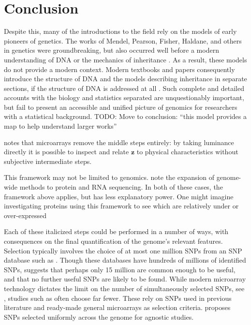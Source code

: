 \documentclass{article}
\newcommand{\ve}[1]{\mathbf{#1}}           %
\newcommand{\TODO}[1]{{\color{brickred} TODO:  {#1}}}
\begin{document}

\section{Conclusion} \label{sec:conclusion}

Despite this, many of the introductions to the field rely on the models of early pioneers of genetics. The works of Mendel, Pearson, Fisher, Haldane, and others in genetics were groundbreaking, but also occurred well before a modern understanding of DNA or the mechanics of inheritance \cite{visschergoddard2019}. As a result, these models do not provide a modern context. Modern textbooks and papers consequently introduce the structure of DNA and the models describing inheritance in separate sections, if the structure of DNA is addressed at all \cite{crowkimura1970intro, siegmundyakir2007, xu2013principles, liu1998statistical}. Such complete and detailed accounts with the biology and statistics separated are unquestionably important, but fail to present an accessible and unified picture of genomics for researchers with a statistical background. \TODO{Move to conclusion: ``this model provides a map to help understand larger works''}

\cite{laframboise2009} notes that microarrays remove the middle steps entirely: by taking luminance directly it is possible to inspect and relate $\ve{z}$ to physical characteristics without subjective intermediate steps.

This framework may not be limited to genomics. \cite{hasinetal2017multi} note the expansion of genome-wide methods to protein and RNA sequencing. In both of these cases, the framework above applies, but has less explanatory power. One might imagine investigating proteins using this framework to see which are relatively under or over-expressed

Each of these italicized steps could be performed in a number of ways, with consequences on the final quantification of the genome's relevant features. Selection typically involves the choice of at most one million SNPs from an SNP database such as \cite{NCBIdbSNP}. Though these databases have hundreds of millions of identified SNPs, \cite{koboldtetal2013next} suggests that perhaps only 15 million are common enough to be useful, and that no further useful SNPs are likely to be found. While modern microarray technology dictates the limit on the number of simultaneously selected SNPs, see \cite{laframboise2009, tametal2019benefits}, studies such as \cite{assimesetal2016cadgwas} often choose far fewer. These rely on SNPs used in previous literature and ready-made general microarrays as selection criteria. \cite{LanderBotstein1989} proposes SNPs selected uniformly across the genome for agnostic studies.
\end{document}

